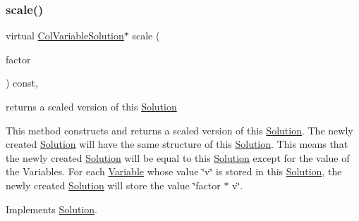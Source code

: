 \subsubsection{\texorpdfstring{scale()}{scale()}\hspace{0.1cm}{\footnotesize\ttfamily [1/2]}}
{\footnotesize\ttfamily virtual \mbox{\hyperlink{class_s_m_spp__di__unipi__it_1_1_col_variable_solution}{Col\+Variable\+Solution}}$\ast$ scale (\begin{DoxyParamCaption}\item[{double}]{factor }\end{DoxyParamCaption}) const\hspace{0.3cm}{\ttfamily [override]}, {\ttfamily [virtual]}}



returns a scaled version of this \mbox{\hyperlink{class_s_m_spp__di__unipi__it_1_1_solution}{Solution}} 

This method constructs and returns a scaled version of this \mbox{\hyperlink{class_s_m_spp__di__unipi__it_1_1_solution}{Solution}}. The newly created \mbox{\hyperlink{class_s_m_spp__di__unipi__it_1_1_solution}{Solution}} will have the same structure of this \mbox{\hyperlink{class_s_m_spp__di__unipi__it_1_1_solution}{Solution}}. This means that the newly created \mbox{\hyperlink{class_s_m_spp__di__unipi__it_1_1_solution}{Solution}} will be equal to this \mbox{\hyperlink{class_s_m_spp__di__unipi__it_1_1_solution}{Solution}} except for the value of the Variables. For each \mbox{\hyperlink{class_s_m_spp__di__unipi__it_1_1_variable}{Variable}} whose value \char`\"{}v\char`\"{} is stored in this \mbox{\hyperlink{class_s_m_spp__di__unipi__it_1_1_solution}{Solution}}, the newly created \mbox{\hyperlink{class_s_m_spp__di__unipi__it_1_1_solution}{Solution}} will store the value \char`\"{}factor $\ast$ v\char`\"{}. 

Implements \mbox{\hyperlink{class_s_m_spp__di__unipi__it_1_1_solution_abf1a2d1763f128a72b2677d4b9ff4d3b}{Solution}}.

\mbox{\label{class_s_m_spp__di__unipi__it_1_1_col_variable_solution_a09f298a3b695814cde2e7835071081fd}} 
